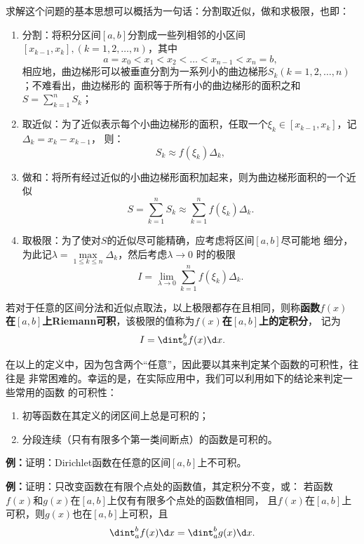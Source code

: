 求解这个问题的基本思想可以概括为一句话：{\kaishu 分割取近似，做和求极限}，也即：

\begin{enumerate}
  \setlength{\itemindent}{1cm}
  \item {\kaishu 分割}：将积分区间$[a,b]$分割成一些列相邻的小区间$[x_{k-1},x_k],
  (k=1,2,\ldots,n)$，其中
  $$a=x_0<x_1<x_2<\ldots<x_{n-1}<x_n=b,$$
  相应地，曲边梯形可以被垂直分割为一系列小的曲边梯形$S_k(k=1,2,\ldots,n)$；不难看出，曲边梯形的
  面积等于所有小的曲边梯形的面积之和$S=\sum\limits_{k=1}^nS_k$；
  \item {\kaishu 取近似}：为了近似表示每个小曲边梯形的面积，任取一个$\xi_k\in
  [x_{k-1},x_k]$，记$\Delta_k=x_k-x_{k-1}$， 则：
  $$S_k\approx f(\xi_k)\Delta_k,$$
  \item {\kaishu 做和}：将所有经过近似的小曲边梯形面积加起来，则为曲边梯形面积的一个近似
  $$S=\sum\limits_{k=1}^nS_k\approx\sum\limits_{k=1}^nf(\xi_k)\Delta_k.$$
  \item {\kaishu 取极限}：为了使对$S$的近似尽可能精确，应考虑将区间$[a,b]$尽可能地
  细分，为此记$\lambda=\max\limits_{1\leq k\leq n}\Delta_k$，然后考虑$\lambda\to0$
  时的极限
  $$I=\lim\limits_{\lambda\to0}\sum\limits_{k=1}^nf(\xi_k)\Delta_k.$$
\end{enumerate}

\begin{thx}
	若对于{\kaishu 任意}的区间分法和近似点取法，以上极限都存在且相同，则称{\bf 函数$f(x)$
	在$[a,b]$上Riemann可积}，该极限的值称为{\bf $f(x)$在$[a,b]$上的定积分}，
	记为
	$$I=\dint_a^bf(x)\d x.$$
\end{thx}

在以上的定义中，因为包含两个“任意”，因此要以其来判定某个函数的可积性，往往是
非常困难的。幸运的是，在实际应用中，我们可以利用如下的结论来判定一些常用的函数
的可积性：

\begin{thx}
	\begin{enumerate}
	  \item 初等函数在其定义的闭区间上总是可积的；
	  \item 分段连续（只有有限多个第一类间断点）的函数是可积的。
	\end{enumerate}
\end{thx}


{\bf 例：}证明：Dirichlet函数在任意的区间$[a,b]$上不可积。

{\bf 例：}证明：只改变函数在有限个点处的函数值，其定积分不变，或：
若函数$f(x)$和$g(x)$在$[a,b]$上仅有有限多个点处的函数值相同，
且$f(x)$在$[a,b]$上可积，则$g(x)$也在$[a,b]$上可积，且
$$\dint_a^bf(x)\d x=\dint_a^bg(x)\d x.$$

